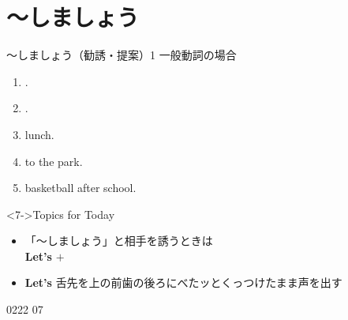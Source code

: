 \documentclass[aspectratio=169,xcolor={dvipsnames,table}]{beamer}
\begin{document}
\section{～しましょう}
\begin{frame}[plain]{～しましょう（勧誘・提案）1}
  一般動詞の場合\pause
  \begin{enumerate}[<+->]
    \item {} .
    \item {} .
    \item {}  lunch.
    \item {}  to the park.
    \item {}  basketball after school.
  \end{enumerate}

  \begin{block}<7->{Topics for Today}
    \begin{itemize}[square]\small
      \item 「～しましょう」と相手を誘うときは\\
            \mbox{}\hfill\textbf{Let's} $+$ \hfill\mbox{}\\
      \item<9-> \textbf{Let's} \hfill{\scriptsize 舌先を上の前歯の後ろにべたッとくっつけたまま声を出す}
    \end{itemize}
  \end{block}

  \hfill{\tiny 0222}\,{\scriptsize {}}\,{\tiny 07}
\end{frame}
\end{document}
